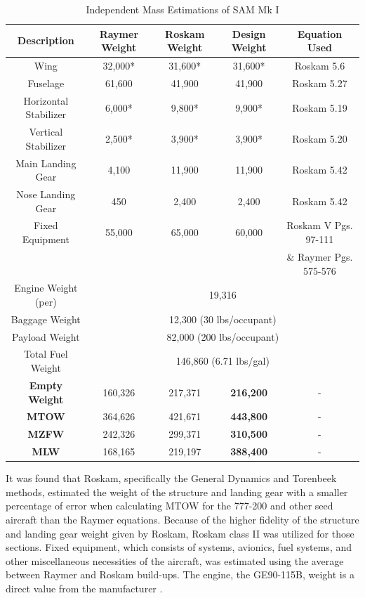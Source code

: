 \begin{table}[!h]
\centering
\caption{Independent Mass Estimations of SAM Mk I}
\begin{tabular}{|c||c|c|c|c| }
\toprule
\multicolumn{1}{|c||}{\textbf{Description}} & \multicolumn{1}{c|}{\textbf{Raymer Weight}} &  
 \textbf{Roskam Weight} & \textbf{Design Weight} & \textbf{Equation Used} \\ \hline \hline 
Wing & 32,000* & 31,600* & 31,600* & Roskam 5.6  \cite{roskam_5} \\ \hline
Fuselage & 61,600 & 41,900 & 41,900 & Roskam 5.27  \cite{roskam_5} \\ \hline
Horizontal Stabilizer & 6,000* & 9,800* & 9,900* & Roskam 5.19 \cite{roskam_5} \\ \hline
Vertical Stabilizer & 2,500* & 3,900* & 3,900* & Roskam 5.20 \cite{roskam_5} \\ \hline
Main Landing Gear & 4,100 & 11,900 & 11,900 & Roskam 5.42  \cite{roskam_5} \\ \hline
Nose Landing Gear & 450 &2,400 & 2,400 & Roskam 5.42  \cite{roskam_5} \\ \hline
Fixed Equipment & 55,000 & 65,000 & 60,000 & Roskam V Pgs. 97-111 \cite{roskam_5}  \\
& & & & \& Raymer Pgs. 575-576 \cite{raymer} \\ \hline
Engine Weight (per) &  \multicolumn{4}{|c|}{19,316}   \\ \hline
Baggage Weight & \multicolumn{4}{|c|}{12,300 (30 lbs/occupant) }  \\ \hline
Payload Weight & \multicolumn{4}{|c|}{82,000 (200 lbs/occupant) }  \\ \hline
Total Fuel Weight & \multicolumn{4}{|c|}{146,860 (6.71 lbs/gal) }  \\ \hline \hline
\textbf{Empty Weight} & 160,326 & 217,371 & \textbf{216,200} & -\\ \hline
\textbf{MTOW} & 364,626 & 421,671 & \textbf{443,800}  & - \\ \hline
\textbf{MZFW} & 242,326 & 299,371 & \textbf{310,500}  & - \\ \hline
\textbf{MLW} & 168,165 & 219,197 & \textbf{388,400} & - \\
\bottomrule
\end{tabular}
\label{tab:mass_props}
\end{table}
\FloatBarrier

It was found that Roskam, specifically the General Dynamics and Torenbeek methods, estimated the weight of the structure and landing gear with a smaller percentage of error when calculating MTOW for the 777-200 and other seed aircraft than the Raymer equations. Because of the higher fidelity of the structure and landing gear weight given by Roskam, Roskam class II was utilized for those sections. Fixed equipment, which consists of systems, avionics, fuel systems, and other miscellaneous necessities of the aircraft, was estimated using the average between Raymer and Roskam build-ups. The engine, the GE90-115B, weight is a direct value from the manufacturer \cite{roskam_5} \cite{raymer}.

